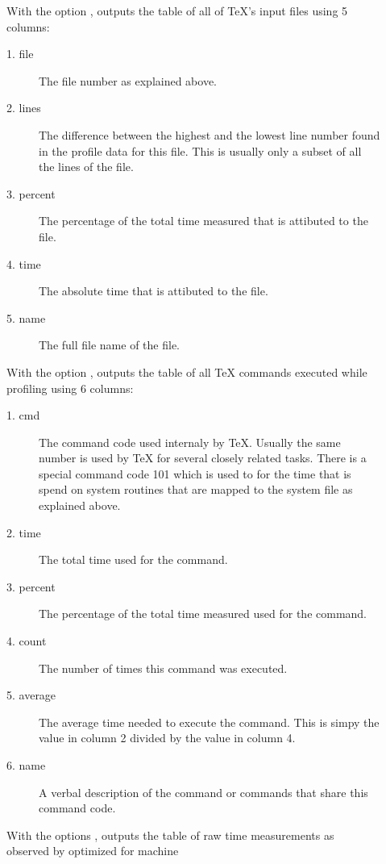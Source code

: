 \documentclass[a4paper,english]{article}
\begin{document}
\begin{description}
\item[  ]
  With the option ,  outputs the table
  of all of TeX's input files using 5 columns: 
    \begin{description}
    \item[1. file] The file number as explained above.
    \item[2. lines] The difference between the highest and the lowest
      line number found in the profile data for this file. This is
      usually only a subset of all the lines of the file.
    \item[3. percent]
      The percentage of the total time measured that is attibuted to the file.
    \item[4. time]
      The absolute time that is attibuted to the file.
    \item[5. name]
      The full file name of the file.
    \end{description}
\item[  ]
   With the option ,  outputs the table
   of all TeX commands executed while profiling
   using 6 columns: 
    \begin{description}
    \item[1. cmd] The command code used internaly by TeX.
      Usually the same number is used by TeX for several
      closely related tasks.
      There is a special command code 101 which is used to
      for the time that is spend on system routines that are
      mapped to the system file as explained above.
    \item[2. time]
      The total time used for the command.
    \item[3. percent]
      The percentage of the total time measured used for the command.
    \item[4. count]
      The number of times this command was executed.
    \item[5. average]
      The average time needed to execute the command.
      This is simpy the value in column 2 divided by the value in column 4.
    \item[6. name]
      A verbal description of the command or commands that share this
      command code.
    \end{description}
\item[    ]
  With the options  ,  outputs the table
  of raw time measurements as observed by  optimized for machine

\end{description}
\end{document}
